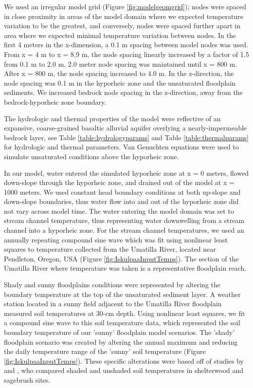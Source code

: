 \documentclass[letterpaper, 11pt]{article}
\begin{document}
We used an irregular model grid (Figure \ref{fig:modelgeomgrid}); nodes were spaced in close proximity in areas of the model domain where we expected temperature variation to be the greatest, and conversely, nodes were spaced further apart in area where we expected minimal temperature variation between nodes. In the first 4 meters in the x-dimension, a 0.1 m spacing between model nodes was used. From x = 4 m to x = 8.9 m, the node spacing linearly increased by a factor of 1.5 from 0.1 m to 2.0 m. 2.0 meter node spacing was maintained until x = 800 m. After x = 800 m, the node spacing increased to 4.0 m. In the z-direction, the node spacing was 0.1 m in the hyporheic zone and the unsaturated floodplain sediments. We increased bedrock node spacing in the z-direction, away from the bedrock-hyporheic zone boundary.






The hydrologic and thermal properties of the model were reflective of an expansive, coarse-grained basaltic alluvial aquifer overlying a nearly-impermeable bedrock layer, see Table \ref{table:hydrologyparams} and Table \ref{table:thermalparams} for hydrologic and thermal parameters. Van Genuchten equations were used to simulate unsaturated conditions above the hyporheic zone.


In our model, water entered the simulated hyporheic zone at x = 0 meters, flowed down-slope through the hyporheic zone, and drained out of the model at x = 1000 meters. We used constant head boundary conditions at both up-slope and down-slope boundaries, thus water flow into and out of the hyporheic zone did not vary across model time. The water entering the model domain was set to stream channel temperature, thus representing water downwelling from a stream channel into a hyporheic zone. For the stream channel temperatures, we used an annually repeating compound sine wave which was fit using nonlinear least squares to temperature collected from the Umatilla River, located near Pendleton, Oregon, USA (Figure \ref{fig:IskulpaaInputTemps}). The section of the Umatilla River where temperature was taken is a representative floodplain reach.

Shady and sunny floodplains conditions were represented by altering the boundary temperature at the top of the unsaturated sediment layer. A weather station located in a sunny field adjacent to the Umatilla River floodplain measured soil temperatures at 30-cm depth. Using nonlinear least squares, we fit a compound sine wave to this soil temperature data, which represented the soil boundary temperature of our 'sunny' floodplain model scenarios. The 'shady' floodplain scenario was created by altering the annual maximum and reducing the daily temperature range of the 'sunny' soil temperature (Figure \ref{fig:IskulpaaInputTemps}). These specific alterations were based off of studies by \cite{Childs1987EffectEnvironments} and \cite{Pierson1991VariabilityRangeland}, who compared shaded and unshaded soil temperatures in shelterwood and sagebrush sites.
\end{document}
